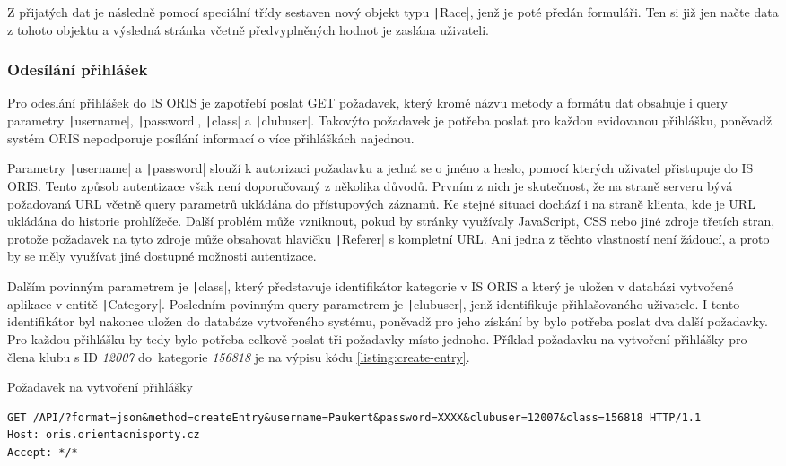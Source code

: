 Z přijatých dat je následně pomocí speciální třídy sestaven nový objekt typu \texttt|Race|, jenž je poté předán formuláři. Ten si již jen načte data z tohoto objektu a výsledná stránka včetně předvyplněných hodnot je zaslána uživateli.

\subsubsection{Odesílání přihlášek}
Pro odeslání přihlášek do IS ORIS je zapotřebí poslat GET požadavek, který kromě názvu metody a formátu dat obsahuje i query parametry \texttt|username|, \texttt|password|, \texttt|class| a \texttt|clubuser|. Takovýto požadavek je potřeba poslat pro každou evidovanou přihlášku, poněvadž systém ORIS nepodporuje posílání informací o více přihláškách najednou.

Parametry \texttt|username| a \texttt|password| slouží k autorizaci požadavku a jedná se o jméno a heslo, pomocí kterých uživatel přistupuje do IS ORIS. Tento způsob autentizace však není doporučovaný z několika důvodů. Prvním z nich je skutečnost, že na straně serveru bývá požadovaná URL včetně query parametrů ukládána do přístupových záznamů. Ke stejné situaci dochází i na straně klienta, kde je URL ukládána do historie prohlížeče. Další problém může vzniknout, pokud by stránky využívaly JavaScript, CSS nebo jiné zdroje třetích stran, protože požadavek na tyto zdroje může obsahovat hlavičku \texttt|Referer| s kompletní URL. Ani jedna z těchto vlastností není žádoucí, a proto by se měly využívat jiné dostupné možnosti autentizace. \cite{query-parameters-security}

Dalším povinným parametrem je \texttt|class|, který představuje identifikátor kategorie v IS ORIS a který je uložen v databázi vytvořené aplikace v entitě \texttt|Category|. Posledním povinným query parametrem je \texttt|clubuser|, jenž identifikuje přihlašovaného uživatele. I tento identifikátor byl nakonec uložen do databáze vytvořeného systému, poněvadž pro jeho získání by bylo potřeba poslat dva další požadavky. Pro každou přihlášku by tedy bylo potřeba celkově poslat tři požadavky místo jednoho. Příklad požadavku na vytvoření přihlášky pro člena klubu s ID \emph{12007} do~kategorie \emph{156818} je na výpisu kódu \ref{listing:create-entry}.

\begin{listing}[h]
    \caption{Požadavek na vytvoření přihlášky}\label{listing:create-entry}
    \begin{verbatim}
GET /API/?format=json&method=createEntry&username=Paukert&password=XXXX&clubuser=12007&class=156818 HTTP/1.1
Host: oris.orientacnisporty.cz
Accept: */*
    \end{verbatim}
\end{listing}
\vspace{-6mm}
